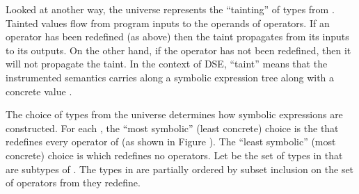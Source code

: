 \documentclass{IOS-Book-Article}
\begin{document}
\begin{mdP}[class={indent},data-line={428}]%
{}Looked at another way, the universe %
{}%
{} represents the %
{}{\textquotedblleft}tainting{\textquotedblright}%
{} of
types from %
{}%
{}. Tainted values flow from program inputs to the 
operands of operators. If an operator has been redefined
(as above) then the taint propagates from its inputs to its outputs.
On the other hand, if the operator has not been redefined, then it will
not propagate the taint. In the context of DSE, %
{}{\textquotedblleft}taint{\textquotedblright}%
{} means
that the instrumented semantics carries along a symbolic expression tree %
{}%
{}
along with a concrete value %
{}%
{}.%
\end{mdP}%
\begin{mdP}[class={indent},data-line={437}]%
{}The choice of types from the universe %
{}%
{} determines how symbolic
expressions are constructed. For each %
{}%
{}, the %
{}{\textquotedblleft}most symbolic{\textquotedblright}%
{}
(least concrete) choice is the %
{}%
{} that redefines every operator of %
{}%
{}
(as shown in Figure%
{}{\mdNbsp}%
{}).
The %
{}{\textquotedblleft}least symbolic{\textquotedblright}%
{} (most concrete) choice is %
{}%
{} which
redefines no operators.  Let %
{}%
{} be the
set of types in %
{}%
{} that are subtypes of %
{}%
{}. The types
in %
{}%
{} are partially ordered by subset inclusion on the 
set of operators from %
{}%
{} they redefine.%
\end{mdP}%
\end{document}
